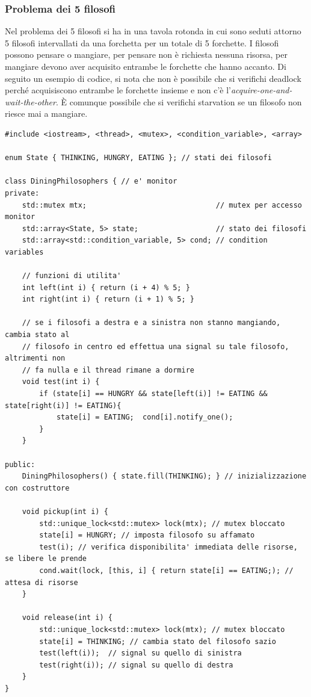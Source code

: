 \documentclass[a4paper]{article}
\begin{document}
\subsubsection*{Problema dei 5 filosofi}
Nel problema dei 5 filosofi si ha in una tavola rotonda in cui sono seduti attorno 5 filosofi intervallati da una forchetta
per un totale di 5 forchette. I filosofi possono pensare o mangiare, per pensare non è richiesta nessuna risorsa, per mangiare
devono aver acquisito entrambe le forchette che hanno accanto. Di seguito un esempio di codice, si nota che non è possibile che
si verifichi deadlock perché acquisiscono entrambe le forchette insieme e non c'è l'\textit{acquire-one-and-wait-the-other}. È
comunque possibile che si verifichi starvation se un filosofo non riesce mai a mangiare.
\begin{lstlisting}
#include <iostream>, <thread>, <mutex>, <condition_variable>, <array>

enum State { THINKING, HUNGRY, EATING }; // stati dei filosofi

class DiningPhilosophers { // e' monitor
private:
	std::mutex mtx;                              // mutex per accesso monitor
	std::array<State, 5> state;                  // stato dei filosofi
    std::array<std::condition_variable, 5> cond; // condition variables

	// funzioni di utilita'
	int left(int i) { return (i + 4) % 5; }
    int right(int i) { return (i + 1) % 5; }

	// se i filosofi a destra e a sinistra non stanno mangiando, cambia stato al
	// filosofo in centro ed effettua una signal su tale filosofo, altrimenti non
	// fa nulla e il thread rimane a dormire
	void test(int i) {
        if (state[i] == HUNGRY && state[left(i)] != EATING && state[right(i)] != EATING){
            state[i] = EATING;  cond[i].notify_one();
        }
    }

public:
	DiningPhilosophers() { state.fill(THINKING); } // inizializzazione con costruttore

	void pickup(int i) {
		std::unique_lock<std::mutex> lock(mtx); // mutex bloccato
		state[i] = HUNGRY; // imposta filosofo su affamato
		test(i); // verifica disponibilita' immediata delle risorse, se libere le prende
		cond.wait(lock, [this, i] { return state[i] == EATING;); // attesa di risorse
	}

	void release(int i) {
        std::unique_lock<std::mutex> lock(mtx); // mutex bloccato
        state[i] = THINKING; // cambia stato del filosofo sazio
        test(left(i));  // signal su quello di sinistra
        test(right(i)); // signal su quello di destra
	}
}


\end{lstlisting}
\end{document}
